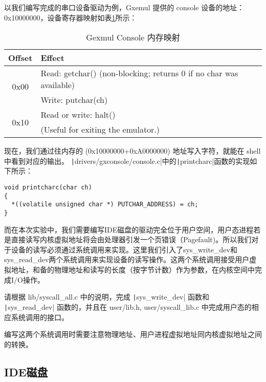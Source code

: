 以我们编写完成的串口设备驱动为例，Gxemul 提供的 console 设备的地址：0x10000000，设备寄存器映射如表\ref{lab5-table-console-mem-map}所示：

\begin{table}[htbp]
\caption{Gexmul Console 内存映射}\label{lab5-table-console-mem-map}
\centering
\begin{tabular}{|c|l|}
  \hline
    Offset & Effect \\
  \hline
  \multirow{2}{*}{0x00} & Read: getchar() (non-blocking; returns 0 if no char was available) \\
  \cline{2-2}
    & Write: putchar(ch) \\
  \hline
    \multirow{2}{*}{0x10} & Read or write: halt() \\
  \cline{2-2}
    & (Useful for exiting the emulator.) \\
  \hline
\end{tabular}
\end{table}

现在，我们通过往内存的 (0x10000000+0xA0000000) 地址写入字符，就能在 shell 中看到对应的输出。
\texttt|drivers/gxconsole/console.c|中的\texttt|printcharc|函数的实现如下所示：

\begin{verbatim}
void printcharc(char ch)
{
  *((volatile unsigned char *) PUTCHAR_ADDRESS) = ch;
}
\end{verbatim}

而在本次实验中，我们需要编写IDE磁盘的驱动完全位于用户空间，用户态进程若是直接读写内核虚拟地址将会由处理器引发一个页错误（Pagefault)。所以我们对于设备的读写必须通过系统调用来实现。这里我们引入了sys\_write\_dev和sys\_read\_dev两个系统调用来实现设备的读写操作。这两个系统调用接受用户虚拟地址，和备的物理地址和读写的长度（按字节计数）作为参数，在内核空间中完成I/O操作。

\begin{exercise}
请根据 lib/syscall\_all.c 中的说明，完成 \texttt|sys_write_dev| 函数和 \texttt|sys_read_dev| 函数的，并且在 user/lib.h, user/syscall\_lib.c 中完成用户态的相应系统调用的接口。

编写这两个系统调用时需要注意物理地址、用户进程虚拟地址同内核虚拟地址之间的转换。
\end{exercise}

\subsection{IDE磁盘}

